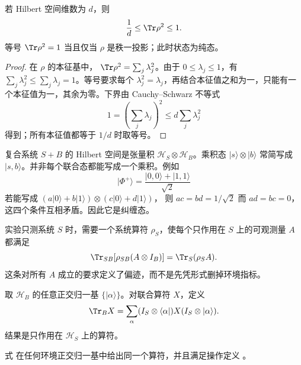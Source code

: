\begin{proposition}[纯度判据]
若 Hilbert 空间维数为 \(d\)，则
\[
\frac1d\leq\Tr\rho^2\leq1.
\]
等号 \(\Tr\rho^2=1\) 当且仅当 \(\rho\) 是秩一投影；此时状态为纯态。
\end{proposition}

\begin{proof}
在 \(\rho\) 的本征基中，
\(\Tr\rho^2=\sum_j\lambda_j^2\)。由于
\(0\leq\lambda_j\leq1\)，有
\(\sum_j\lambda_j^2\leq\sum_j\lambda_j=1\)。等号要求每个
\(\lambda_j^2=\lambda_j\)，再结合本征值之和为一，只能有一个本征值为一，其余为零。下界由 Cauchy--Schwarz 不等式
\[
1=\left(\sum_j\lambda_j\right)^2
\leq d\sum_j\lambda_j^2
\]
得到；所有本征值都等于 \(1/d\) 时取等号。
\end{proof}

复合系统 \(S+B\) 的 Hilbert 空间是张量积
\(\mathcal H_S\otimes\mathcal H_B\)。乘积态
\(\lvert s\rangle\otimes\lvert b\rangle\)
常简写成 \(\lvert s,b\rangle\)。并非每个联合态都能写成一个乘积。例如
\[
\lvert\Phi^+\rangle
=\frac{\lvert0,0\rangle+\lvert1,1\rangle}{\sqrt2}
\]
若能写成
\((a\lvert0\rangle+b\lvert1\rangle)\otimes
(c\lvert0\rangle+d\lvert1\rangle)\)，
则 \(ac=bd=1/\sqrt2\) 而 \(ad=bc=0\)，这四个条件互相矛盾。因此它是纠缠态。

实验只测系统 \(S\) 时，需要一个系统算符 \(\rho_S\)，使每个只作用在 \(S\) 上的可观测量 \(A\) 都满足
\begin{equation}
\Tr_{SB}\!\left[\rho_{SB}(A\otimes I_B)\right]
=\Tr_S(\rho_S A).
\label{eq:oqs-partial-trace-operational}
\end{equation}
这条对所有 \(A\) 成立的要求定义了偏迹，而不是先凭形式删掉环境指标。

\begin{definition}[偏迹]
取 \(\mathcal H_B\) 的任意正交归一基
\(\{\lvert\alpha\rangle\}\)。对联合算符 \(X\)，定义
\begin{equation}
\Tr_B X
=\sum_\alpha
(I_S\otimes\langle\alpha\rvert)X
(I_S\otimes\lvert\alpha\rangle).
\label{eq:oqs-partial-trace-definition}
\end{equation}
结果是只作用在 \(\mathcal H_S\) 上的算符。
\end{definition}

\begin{proposition}[偏迹与所选环境基无关]
式  在任何环境正交归一基中给出同一个算符，并且满足操作定义
。
\end{proposition}

